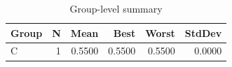 \begin{table}[htbp]
\centering
\caption{Group-level summary}
\label{tab:group-summary}
\begin{tabular}{lrrrrr}
\toprule
\textbf{Group} & \textbf{N} & \textbf{Mean} & \textbf{Best} & \textbf{Worst} & \textbf{StdDev} \\
\midrule
C & 1 & 0.5500 & 0.5500 & 0.5500 & 0.0000 \\
\bottomrule
\end{tabular}
\end{table}